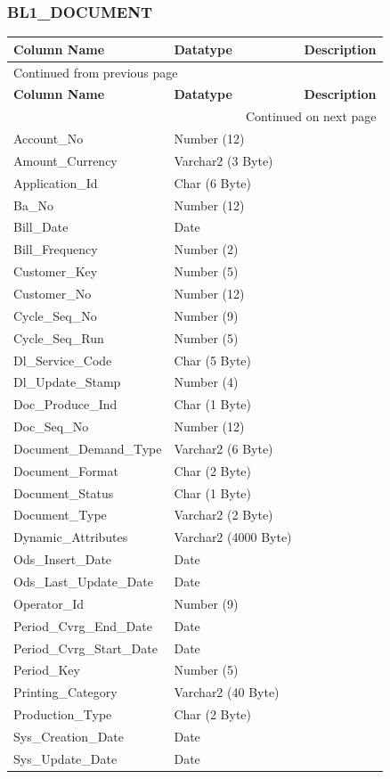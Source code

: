 \documentclass[12pt,twoside]{article}
\begin{document}
\normalsize

\subsubsection{BL1\_DOCUMENT}
\label{sec:orgheadline151}
\footnotesize

\begin{longtable}{l|l|l}
\hline
\textbf{Column Name} & \textbf{Datatype} & \textbf{Description}\\
\hline
\endfirsthead
\multicolumn{3}{l}{Continued from previous page} \\
\hline

\textbf{Column Name} & \textbf{Datatype} & \textbf{Description} \\

\hline
\endhead
\hline\multicolumn{3}{r}{Continued on next page} \\
\endfoot
\endlastfoot
\hline
Account\_No & Number (12) & \\
Amount\_Currency & Varchar2 (3 Byte) & \\
Application\_Id & Char (6 Byte) & \\
Ba\_No & Number (12) & \\
Bill\_Date & Date & \\
Bill\_Frequency & Number (2) & \\
Customer\_Key & Number (5) & \\
Customer\_No & Number (12) & \\
Cycle\_Seq\_No & Number (9) & \\
Cycle\_Seq\_Run & Number (5) & \\
Dl\_Service\_Code & Char (5 Byte) & \\
Dl\_Update\_Stamp & Number (4) & \\
Doc\_Produce\_Ind & Char (1 Byte) & \\
Doc\_Seq\_No & Number (12) & \\
Document\_Demand\_Type & Varchar2 (6 Byte) & \\
Document\_Format & Char (2 Byte) & \\
Document\_Status & Char (1 Byte) & \\
Document\_Type & Varchar2 (2 Byte) & \\
Dynamic\_Attributes & Varchar2 (4000 Byte) & \\
Ods\_Insert\_Date & Date & \\
Ods\_Last\_Update\_Date & Date & \\
Operator\_Id & Number (9) & \\
Period\_Cvrg\_End\_Date & Date & \\
Period\_Cvrg\_Start\_Date & Date & \\
Period\_Key & Number (5) & \\
Printing\_Category & Varchar2 (40 Byte) & \\
Production\_Type & Char (2 Byte) & \\
Sys\_Creation\_Date & Date & \\
Sys\_Update\_Date & Date & \\
\hline
\end{longtable}
\end{document}
